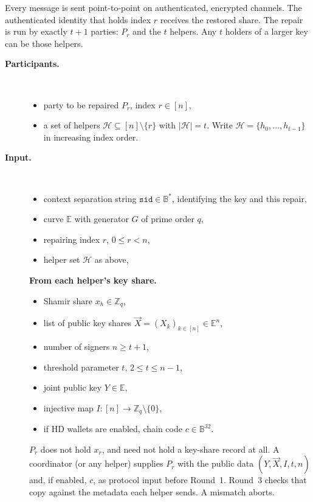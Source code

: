 \documentclass[11pt]{article}
\newcommand{\sid}{\ensuremath{\mathtt{sid}}}
\newcommand{\?}[1]{\stackrel{?}{#1}}
\newcommand{\Byte}{\ensuremath{\mathbb{B}}}
\newcommand{\Z}{\mathbb{Z}}
\newcommand{\E}{\mathbb{E}}
\newcommand{\Hs}{\mathcal{H}}
\begin{document}
Every message is sent point-to-point on authenticated, encrypted channels.
The authenticated identity that holds index $r$ receives the restored share.
The repair is run by exactly $t+1$ parties: $P_r$ and the $t$ helpers.
Any $t$ holders of a larger key can be those helpers.

\begin{description}
    \item[\bf Participants.] \
    \begin{itemize}[noitemsep,topsep=0pt]
    \item party to be repaired $P_r$, index $r \in [n]$,
    \item a set of helpers $\Hs \subseteq [n] \setminus \{r\}$ with $|\Hs| = t$.
          Write $\Hs = \{h_0, \ldots, h_{t-1}\}$ in increasing index order.
    \end{itemize}

    \item[\bf Input.] \
    \begin{itemize}[noitemsep,topsep=0pt]
    \item context separation string $\sid \in \Byte^*$, identifying the key and this repair,
    \item curve $\E$ with generator $G$ of prime order $q$,
    \item repairing index $r$, $0 \le r < n$,
    \item helper set $\Hs$ as above,
    \end{itemize}
    \textbf{From each helper's key share.}
    \begin{itemize}[noitemsep,topsep=0pt]
    \item Shamir share $x_h \in \Z_q$,
    \item list of public key shares $\vec X = (X_k)_{k \in [n]} \in \E^n$,
    \item number of signers $n \ge t+1$,
    \item threshold parameter $t$, $2 \le t \le n-1$,
    \item joint public key $Y \in \E$,
    \item injective map $I : [n] \to \Z_q \setminus \{0\}$,
    \item if HD wallets are enabled, chain code $c \in \Byte^{32}$.
    \end{itemize}
    $P_r$ does not hold $x_r$, and need not hold a key-share record at all.
    A coordinator (or any helper) supplies $P_r$ with the public data $(Y, \vec X, I, t, n)$ and, if enabled, $c$, as protocol input before Round~1.
    Round~3 checks that copy against the metadata each helper sends. A mismatch aborts.


\end{description}
\end{document}
